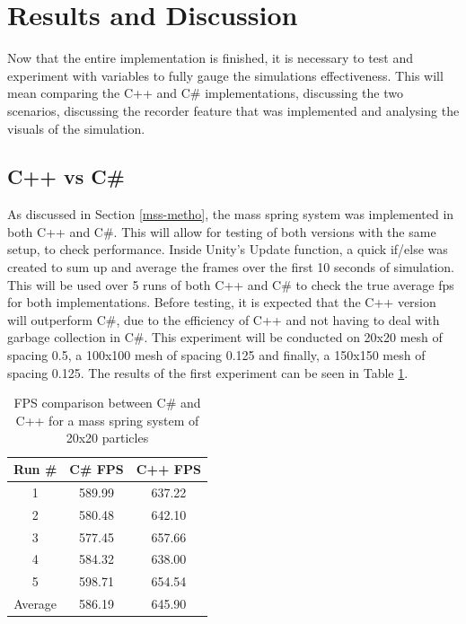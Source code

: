 \documentclass[12pt,a4paper]{article}
\begin{document}
\section{Results and Discussion}
Now that the entire implementation is finished, it is necessary to test and experiment with variables to fully gauge the simulations effectiveness. This will mean comparing the C++ and C\# implementations, discussing the two scenarios, discussing the recorder feature that was implemented and analysing the visuals of the simulation.
\subsection{C++ vs C\#}
\label{cppcomp}
As discussed in Section \ref{mss-metho}, the mass spring system was implemented in both C++ and C\#. This will allow for testing of both versions with the same setup, to check performance. Inside Unity's Update function, a quick if/else was created to sum up and average the frames over the first 10 seconds of simulation. This will be used over 5 runs of both C++ and C\# to check the true average fps for both implementations. Before testing, it is expected that the C++ version will outperform C\#, due to the efficiency of C++ and not having to deal with garbage collection in C\#. This experiment will be conducted on 20x20 mesh of spacing 0.5, a 100x100 mesh of spacing 0.125 and finally, a 150x150 mesh of spacing 0.125. The results of the first experiment can be seen in Table \ref{tab:lang}. \\
\begin{table}[htbp]
	\centering
	\begin{tabular}{|c|c|c|} %
		\hline %
		Run \# & C\# FPS & C++ FPS \\ %
		\hline %
		1 & 589.99 & 637.22 \\ 
		2 & 580.48 & 642.10 \\ 
		3 & 577.45 & 657.66 \\ 
		4 & 584.32 & 638.00  \\ 
		5 & 598.71 & 654.54  \\ 
		\hline
		Average & 586.19 & 645.90 \\ 
		\hline %
	\end{tabular}
	\caption{FPS comparison between C\# and C++ for a mass spring system of 20x20 particles} %
	\label{tab:lang}
\end{table}
\end{document}
